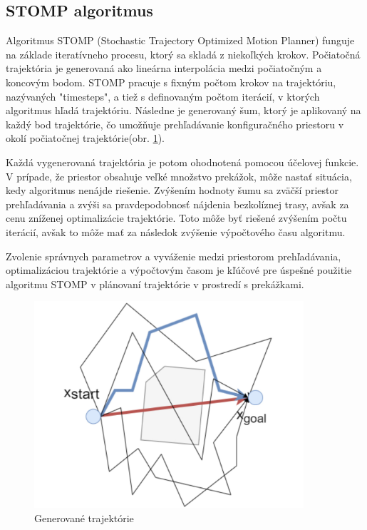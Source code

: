 \subsection{STOMP algoritmus}
\label{kap:2.5}

Algoritmus STOMP (Stochastic Trajectory Optimized Motion Planner) funguje na základe iteratívneho procesu, ktorý sa skladá z niekoľkých krokov. Počiatočná trajektória je generovaná ako lineárna interpolácia medzi počiatočným a koncovým bodom. STOMP pracuje s fixným počtom krokov na trajektóriu, nazývaných "timesteps", a tiež s definovaným počtom iterácií, v ktorých algoritmus hľadá trajektóriu. Následne je generovaný šum, ktorý je aplikovaný na každý bod trajektórie, čo umožňuje prehľadávanie konfiguračného priestoru v okolí počiatočnej trajektórie(obr. \ref{OBRAZOK 1.2.5}).

Každá vygenerovaná trajektória je potom ohodnotená pomocou účelovej funkcie. V prípade, že priestor obsahuje veľké množstvo prekážok, môže nastať situácia, kedy algoritmus nenájde riešenie. Zvýšením hodnoty šumu sa zväčší priestor prehľadávania a zvýši sa pravdepodobnosť nájdenia bezkolíznej trasy, avšak za cenu zníženej optimalizácie trajektórie. Toto môže byť riešené zvýšením počtu iterácií, avšak to môže mať za následok zvýšenie výpočtového času algoritmu.

Zvolenie správnych parametrov a vyváženie medzi priestorom prehľadávania, optimalizáciou trajektórie a výpočtovým časom je kľúčové pre úspešné použitie algoritmu STOMP v plánovaní trajektórie v prostredí s prekážkami.

\begin{figure}[h]
	\centering
	\includegraphics[width=100mm]{img/STOMP.png}
	\caption{Generované trajektórie \cite{}}\label{OBRAZOK 1.2.5} 
\end{figure} 

\begin{figure}[h]
\end{figure} 


